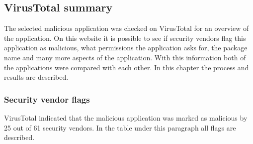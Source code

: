 \subsection{VirusTotal summary}
The selected malicious application was checked on VirusTotal for an overview of the application.
On this website it is possible to see if security vendors flag this application as malicious, what permissions the application asks for, the package name and many more aspects of the application.
With this information both of the applications were compared with each other.
In this chapter the process and results are described.

\subsubsection{Security vendor flags}
VirusTotal indicated that the malicious application was marked as malicious by 25 out of 61 security vendors.
In the table under this paragraph all flags are described.

